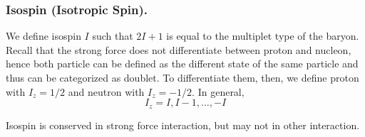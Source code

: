 \documentclass[../../../main.tex]{subfiles}
\begin{document}
\subsubsection{Isospin (Isotropic Spin).} We define isospin $I$ such that $2I+1$ is equal to the multiplet type of the baryon. Recall that the strong force does not differentiate between proton and nucleon, hence both particle can be defined as the different state of the same particle and thus can be categorized as doublet. To differentiate them, then, we define proton with $I_z=1/2$ and neutron with $I_z=-1/2$. In general,
\begin{equation*}
    I_z=I,I-1,\dots,-I
\end{equation*}

Isospin is conserved in strong force interaction, but may not in other interaction.
\end{document}
